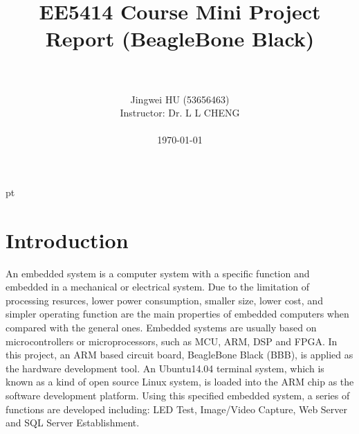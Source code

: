 \documentclass[12pt,journal,draftclsnofoot,onecolumn]{IEEEtran}
\begin{document}

 pt

\begin{titlepage}
\thispagestyle{empty}


\title{EE5414 Course Mini Project Report (BeagleBone Black)}

\author{\\
\author{\authorblockN}{Jingwei HU (53656463)}\\
Instructor: Dr. L L CHENG\\
\\
\today}

\maketitle
\end{titlepage}

{}
\clearpage

\section{Introduction}\label{Intro}
An embedded system is a computer system with a specific function and embedded in a mechanical or electrical system. Due to the limitation of processing resurces, lower power consumption, smaller size, lower cost, and simpler operating function are the main properties of embedded computers when compared with the general ones. Embedded systems are usually based on microcontrollers or microprocessors, such as MCU, ARM, DSP and FPGA. In this project, an ARM based circuit board, BeagleBone Black (BBB), is applied as the hardware development tool. An Ubuntu14.04 terminal system, which is known as a kind of open source Linux system, is loaded into the ARM chip as the software development platform. Using this specified embedded system, a series of functions are developed including: LED Test, Image/Video Capture, Web Server and SQL Server Establishment.

\end{document}
